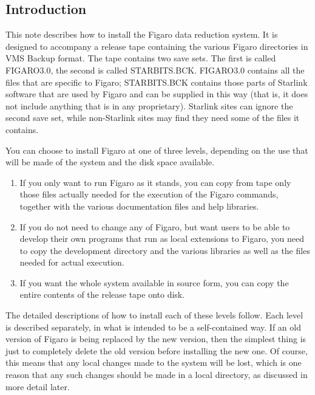 \subsection{Introduction}

This note describes how to install the Figaro data reduction system. It is
designed to accompany a release tape containing the various Figaro directories
in VMS Backup format. The tape contains two save sets. The first is called
FIGARO3.0, the second is called STARBITS.BCK. FIGARO3.0 contains all the files
that are specific to Figaro; STARBITS.BCK contains those parts of Starlink
software that are used by Figaro and can be supplied in this way (that is, it
does not include anything that is in any proprietary). Starlink sites can
ignore the second save set, while non-Starlink sites may find they need some
of the files it contains.

You can choose to install Figaro at one of three levels, depending on the use
that will be made of the system and the disk space available.

\begin{enumerate}

\item If you only want to run Figaro as it stands, you can copy from tape
only those files actually needed for the execution of the Figaro commands, 
together with the various documentation files and help libraries.

\item If you do not need to change any of Figaro, but want users to be able to
develop their own programs that run as local extensions to Figaro, you need to
copy the development directory and the various libraries as well as the files
needed for actual execution.

\item If you want the whole system available in source form, you can copy the
entire contents of the release tape onto disk.
\end{enumerate}

The detailed descriptions of how to install each of these levels follow. Each
level is described separately, in what is intended to be a self-contained way.
If an old version of Figaro is being replaced by the new version, then the
simplest thing is just to completely delete the old version before installing
the new one. Of course, this means that any local changes made to the system
will be lost, which is one reason that any such changes should be made in a
local directory, as discussed in more detail later. 

